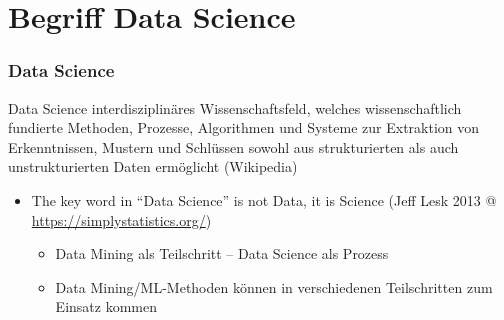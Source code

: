 
\section{Begriff Data Science}


\begin{frame}
  \frametitle{Data Science}

  \begin{block}{Data Science}
  interdisziplinäres Wissenschaftsfeld, welches wissenschaftlich fundierte Methoden, Prozesse, Algorithmen und Systeme zur Extraktion von Erkenntnissen, Mustern und Schlüssen sowohl aus strukturierten als auch unstrukturierten Daten ermöglicht (Wikipedia)
  \end{block}

  \begin{itemize}
  \item The key word in "`Data Science"' is not Data, it is Science (Jeff Lesk 2013 @ \url{https://simplystatistics.org/})
  \begin{itemize}
  \item Data Mining als Teilschritt -- Data Science als Prozess
  \item Data Mining/ML-Methoden können in verschiedenen Teilschritten zum Einsatz kommen
  \end{itemize}
  \end{itemize}
  \end{frame}


